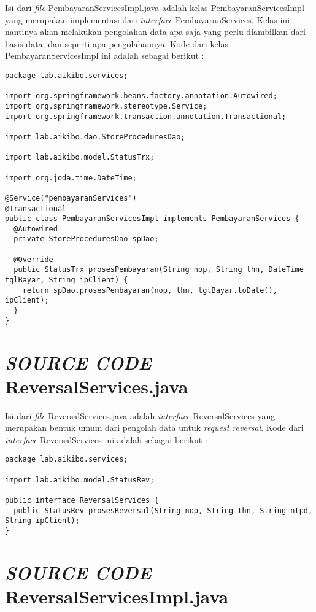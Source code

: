 \documentclass[pdftex,12pt, oneside]{article}
\begin{document}
Isi dari \textit{file} PembayaranServicesImpl.java adalah kelas PembayaranServicesImpl yang merupakan implementasi dari \textit{interface} PembayaranServices. Kelas ini nantinya akan melakukan pengolahan data apa saja yang perlu diambilkan dari basis data, dan seperti apa pengolahannya. Kode dari kelas PembayaranServicesImpl ini adalah sebagai berikut :

\begin{lstlisting}
package lab.aikibo.services;

import org.springframework.beans.factory.annotation.Autowired;
import org.springframework.stereotype.Service;
import org.springframework.transaction.annotation.Transactional;

import lab.aikibo.dao.StoreProceduresDao;

import lab.aikibo.model.StatusTrx;

import org.joda.time.DateTime;

@Service("pembayaranServices")
@Transactional
public class PembayaranServicesImpl implements PembayaranServices {
  @Autowired
  private StoreProceduresDao spDao;

  @Override
  public StatusTrx prosesPembayaran(String nop, String thn, DateTime tglBayar, String ipClient) {
    return spDao.prosesPembayaran(nop, thn, tglBayar.toDate(), ipClient);
  }
}
\end{lstlisting}


\section{\textit{SOURCE CODE} ReversalServices.java}

Isi dari \textit{file} ReversalServices.java adalah \textit{interface} ReversalServices yang merupakan bentuk umum dari pengolah data untuk \textit{request reversal}. Kode dari \textit{interface} ReversalServices ini adalah sebagai berikut :

\begin{lstlisting}
package lab.aikibo.services;

import lab.aikibo.model.StatusRev;

public interface ReversalServices {
  public StatusRev prosesReversal(String nop, String thn, String ntpd, String ipClient);
}
\end{lstlisting}


\section{\textit{SOURCE CODE} ReversalServicesImpl.java}
\end{document}
